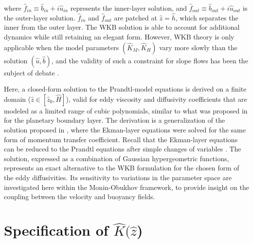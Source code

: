 %
where $\hat{f}_{in} \equiv \hat{b}_{in}+ i\hat{u}_{in}$ represents the inner-layer solution, and $\hat{f}_{out} \equiv \hat{b}_{out} + i\hat{u}_{out}$ is the outer-layer solution. $\hat{f}_{in}$ and $\hat{f}_{out}$ are patched at $\hat{z}=\hat{h}$, which separates the inner from the outer layer.
The WKB solution is able to account for additional dynamics while still retaining an elegant form.
However, WKB theory is only applicable when the model parameters $(\hat{K}_M,\hat{K}_H)$ vary more slowly than the solution $(\hat{u},\hat{b})$, and the validity of such a constraint for slope flows has been the subject of debate \citep{Grisogono2002}.

Here, a closed-form solution to the Prandtl-model equations is derived on a finite domain ($\hat{z} \in [\hat{z}_0,\hat{H}]$), valid for eddy viscosity and diffusivity coefficients that are modeled as a limited range of cubic polynomials, similar to what was proposed in \citet{O'Brien1970} for the planetary boundary layer. 
The derivation is a generalization of the solution proposed in \citet{Nieuwstadt1983a}, where the Ekman-layer equations were solved for the same form of momentum transfer coefficient.
Recall that the Ekman-layer equations can be reduced to the Prandtl equations after simple changes of variables \citep{Veronis1970}. 
The solution, expressed as a combination of Gaussian hypergeometric functions, represents an exact alternative to the WKB formulation for the chosen form of the eddy diffusivities. 
Its sensitivity to variations in the parameter space are investigated here within the Monin-Obukhov framework, to provide insight on the coupling between the velocity and buoyancy fields.



\section{Specification of $\hat{K}(\hat{z}$)}



